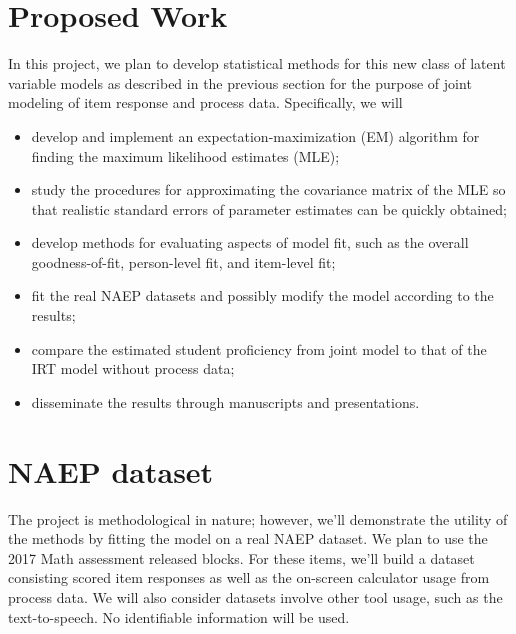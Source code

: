 \documentclass[11pt, letterpaper]{article}
\begin{document}
  \section{Proposed Work}
  In this project, we plan to develop statistical methods for this new class of
  latent variable models as described in the previous section for the purpose of
  joint modeling of item response and process data. Specifically, we will
  \begin{itemize}
    \item develop and implement an expectation-maximization (EM) algorithm for
    finding the maximum likelihood estimates (MLE);

    \item study the procedures for approximating the covariance matrix of the MLE
    so that realistic standard errors of parameter estimates can be quickly
    obtained;

    \item develop methods for evaluating aspects of model fit, such as the
    overall goodness-of-fit, person-level fit, and item-level fit;

    \item fit the real NAEP datasets and possibly modify the model according to
    the results;

    \item compare the estimated student proficiency from joint model to that of
    the IRT model without process data;

    \item disseminate the results through manuscripts and presentations.
  \end{itemize}

  \section{NAEP dataset}
  The project is methodological in nature; however, we'll demonstrate the
  utility of the methods by fitting the model on a real NAEP dataset. We plan to
  use the 2017 Math assessment released blocks. For these items, we'll build a
  dataset consisting scored item responses as well as the on-screen calculator
  usage from process data. We will also consider datasets involve other tool
  usage, such as the text-to-speech. No identifiable information will be used.
\end{document}
